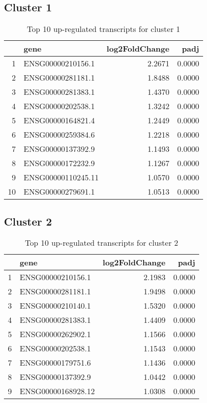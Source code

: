 \documentclass{article}
\begin{document}
\subsection{Cluster 1 }
\begin{table}[H]
\centering
\begin{tabular}{rlrr}
  \hline
 & gene & log2FoldChange & padj \\ 
  \hline
1 & ENSG00000210156.1 & 2.2671 & 0.0000 \\ 
  2 & ENSG00000281181.1 & 1.8488 & 0.0000 \\ 
  3 & ENSG00000281383.1 & 1.4370 & 0.0000 \\ 
  4 & ENSG00000202538.1 & 1.3242 & 0.0000 \\ 
  5 & ENSG00000164821.4 & 1.2449 & 0.0000 \\ 
  6 & ENSG00000259384.6 & 1.2218 & 0.0000 \\ 
  7 & ENSG00000137392.9 & 1.1493 & 0.0000 \\ 
  8 & ENSG00000172232.9 & 1.1267 & 0.0000 \\ 
  9 & ENSG00000110245.11 & 1.0570 & 0.0000 \\ 
  10 & ENSG00000279691.1 & 1.0513 & 0.0000 \\ 
   \hline
\end{tabular}
\caption{Top 10 up-regulated transcripts for cluster 1} 
\label{tab:q3_1_1}
\end{table}
\subsection{Cluster 2 }
\begin{table}[H]
\centering
\begin{tabular}{rlrr}
  \hline
 & gene & log2FoldChange & padj \\ 
  \hline
1 & ENSG00000210156.1 & 2.1983 & 0.0000 \\ 
  2 & ENSG00000281181.1 & 1.9498 & 0.0000 \\ 
  3 & ENSG00000210140.1 & 1.5320 & 0.0000 \\ 
  4 & ENSG00000281383.1 & 1.4409 & 0.0000 \\ 
  5 & ENSG00000262902.1 & 1.1566 & 0.0000 \\ 
  6 & ENSG00000202538.1 & 1.1543 & 0.0000 \\ 
  7 & ENSG00000179751.6 & 1.1436 & 0.0000 \\ 
  8 & ENSG00000137392.9 & 1.0442 & 0.0000 \\ 
  9 & ENSG00000168928.12 & 1.0308 & 0.0000 \\ 
   \hline
\end{tabular}
\caption{Top 10 up-regulated transcripts for cluster 2} 
\label{tab:q3_1_2}
\end{table}
\end{document}
